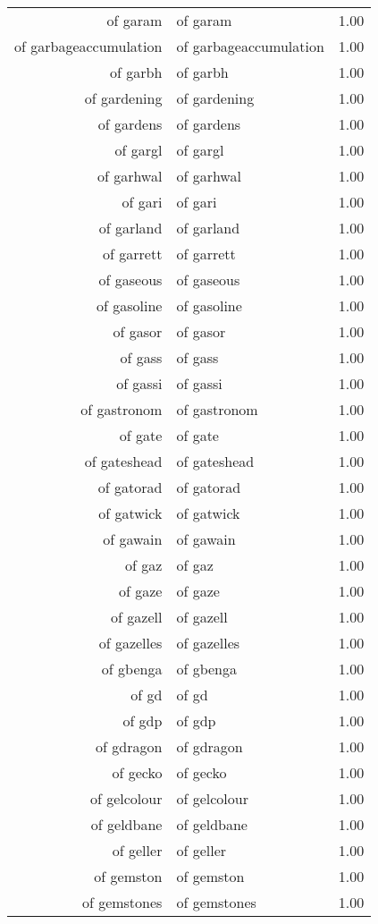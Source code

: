 \begin{table}[ht]
\begin{tabular}{rlr}
  of garam & of garam & 1.00 \\ 
  of garbageaccumulation & of garbageaccumulation & 1.00 \\ 
  of garbh & of garbh & 1.00 \\ 
  of gardening & of gardening & 1.00 \\ 
  of gardens & of gardens & 1.00 \\ 
  of gargl & of gargl & 1.00 \\ 
  of garhwal & of garhwal & 1.00 \\ 
  of gari & of gari & 1.00 \\ 
  of garland & of garland & 1.00 \\ 
  of garrett & of garrett & 1.00 \\ 
  of gaseous & of gaseous & 1.00 \\ 
  of gasoline & of gasoline & 1.00 \\ 
  of gasor & of gasor & 1.00 \\ 
  of gass & of gass & 1.00 \\ 
  of gassi & of gassi & 1.00 \\ 
  of gastronom & of gastronom & 1.00 \\ 
  of gate & of gate & 1.00 \\ 
  of gateshead & of gateshead & 1.00 \\ 
  of gatorad & of gatorad & 1.00 \\ 
  of gatwick & of gatwick & 1.00 \\ 
  of gawain & of gawain & 1.00 \\ 
  of gaz & of gaz & 1.00 \\ 
  of gaze & of gaze & 1.00 \\ 
  of gazell & of gazell & 1.00 \\ 
  of gazelles & of gazelles & 1.00 \\ 
  of gbenga & of gbenga & 1.00 \\ 
  of gd & of gd & 1.00 \\ 
  of gdp & of gdp & 1.00 \\ 
  of gdragon & of gdragon & 1.00 \\ 
  of gecko & of gecko & 1.00 \\ 
  of gelcolour & of gelcolour & 1.00 \\ 
  of geldbane & of geldbane & 1.00 \\ 
  of geller & of geller & 1.00 \\ 
  of gemston & of gemston & 1.00 \\ 
  of gemstones & of gemstones & 1.00 \\ 

\end{tabular}
\end{table}
